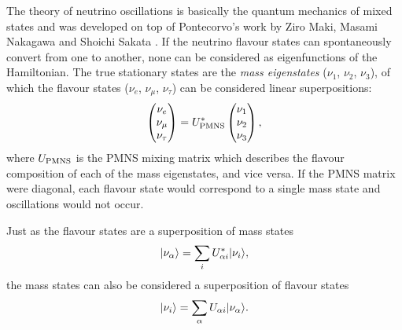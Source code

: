 The theory of neutrino oscillations is basically the quantum mechanics of mixed states and was developed on top of Pontecorvo's work by Ziro Maki, Masami Nakagawa and Shoichi Sakata \cite{MNS1962}.  If the neutrino flavour states can spontaneously convert from one to another, none can be considered as eigenfunctions of the Hamiltonian.  The true stationary states are the \textit{mass eigenstates} ($\nu_1$, $\nu_2$, $\nu_3$), of which the flavour states ($\nu_e$, $\nu_{\mu}$, $\nu_{\tau}$) can be considered linear superpositions:
\begin{equation}
  \begin{pmatrix}
    \nu_e \\
    \nu_{\mu} \\
    \nu_{\tau} \\
  \end{pmatrix}
  =
  U^*_{\textnormal{PMNS}}
  \begin{pmatrix}
    \nu_1 \\
    \nu_2 \\
    \nu_3 \\
  \end{pmatrix},
  \label{eq:FlavourMassStates}
\end{equation}
where $U_{\textnormal{PMNS}}$ is the PMNS mixing matrix which describes the flavour composition of each of the mass eigenstates, and vice versa.  If the PMNS matrix were diagonal, each flavour state would correspond to a single mass state and oscillations would not occur.

Just as the flavour states are a superposition of mass states
\begin{equation}\label{eq:FlavourSuperposition}
  \lvert\nu_{\alpha}\rangle = \sum_i U^*_{\alpha i} \lvert\nu_i\rangle,
\end{equation}
the mass states can also be considered a superposition of flavour states
\begin{equation}\label{eq:MassSuperposition}
  \lvert\nu_i\rangle = \sum_{\alpha} U_{\alpha i} \lvert\nu_{\alpha}\rangle.
\end{equation}

